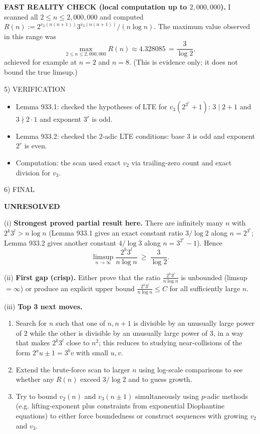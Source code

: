 \medskip
\textbf{FAST REALITY CHECK (local computation up to $2{,}000{,}000$).}
I scanned all $2\le n\le 2{,}000{,}000$ and computed
\(R(n):=2^{v_2(n(n+1))}3^{v_3(n(n+1))}/(n\log n)\).
The maximum value observed in this range was
\[
\max_{2\le n\le 2{,}000{,}000} R(n)\approx 4.328085\,=\frac{3}{\log 2},
\]
achieved for example at $n=2$ and $n=8$.
(This is evidence only; it does not bound the true limsup.)

5) VERIFICATION

\begin{itemize}
\item Lemma 933.1: checked the hypotheses of LTE for $v_3(2^{3^r}+1)$: $3\mid 2+1$ and $3\nmid 2\cdot 1$ and exponent $3^r$ is odd.
\item Lemma 933.2: checked the $2$-adic LTE conditions: base $3$ is odd and exponent $2^r$ is even.
\item Computation: the scan used exact $v_2$ via trailing-zero count and exact division for $v_3$.
\end{itemize}

6) FINAL

\textbf{UNRESOLVED}

(i) \textbf{Strongest proved partial result here.}
There are infinitely many $n$ with $2^k3^l>n\log n$ (Lemma 933.1 gives an exact constant ratio $3/\log 2$ along $n=2^{3^r}$; Lemma 933.2 gives another constant $4/\log 3$ along $n=3^{2^r}-1$). Hence
\[
\limsup_{n\to\infty}\frac{2^k3^l}{n\log n}\ \ge\ \frac{3}{\log 2}.
\]

(ii) \textbf{First gap (crisp).}
Either prove that the ratio $\frac{2^k3^l}{n\log n}$ is unbounded (limsup $=\infty$) or produce an explicit upper bound $\frac{2^k3^l}{n\log n}\le C$ for all sufficiently large $n$.

(iii) \textbf{Top 3 next moves.}
\begin{enumerate}
\item Search for $n$ such that one of $n,n+1$ is divisible by an unusually large power of $2$ while the other is divisible by an unusually large power of $3$, in a way that makes $2^k3^l$ close to $n^2$; this reduces to studying near-collisions of the form $2^a u \pm 1=3^b v$ with small $u,v$.
\item Extend the brute-force scan to larger $n$ using log-scale comparisons to see whether any $R(n)$ exceed $3/\log 2$ and to guess growth.
\item Try to bound $v_2(n)$ and $v_3(n\pm 1)$ simultaneously using $p$-adic methods (e.g. lifting-exponent plus constraints from exponential Diophantine equations) to either force boundedness or construct sequences with growing $v_2$ and $v_3$.
\end{enumerate}


